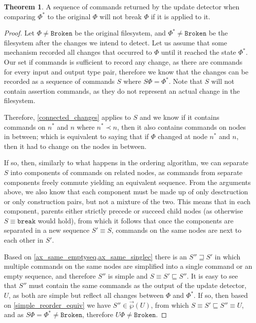 \documentclass[12pt]{article}
\newcommand{\fsbroken}{\mathtt{Broken}} %
\newcommand{\FS}{\Phi} %
\newcommand{\nn}{n^*} %
\newcommand{\cbrk}{\mathtt{break}} %
\newcommand{\descendant}{\prec}
\newcommand{\eqext}{\sqsubseteq} %
\newcommand{\eqnrw}{\sqsupseteq} %
\newcommand{\orderset}[1]{\vec{\wp}({#1})}
\theoremstyle{definition}
\newtheorem{myth}{Theorem}
\begin{document}
\begin{myth}\label{update_works}
A sequence of commands returned by the update detector
when comparing $\FS^*$ to the original $\FS$
will not break $\FS$ if it is applied to it.
\end{myth}
\begin{proof}
Let $\FS\neq\fsbroken$ be the original filesystem, and $\FS^*\neq\fsbroken$
be the filesystem after the changes we intend to detect.
Let us assume that some mechanism recorded all changes that occurred
to $\FS$ until it reached the state $\FS^*$.
Our set if commands is sufficient to record any change, as
there are commands for every input and output type pair, therefore
we know that the changes can be recorded as a sequence of commands $S$
where $S\FS=\FS^*$.
Note that $S$ will not contain assertion commands, as they do not
represent an actual change in the filesystem.

Therefore, \cref{connected_changes} applies to $S$ and we know
if it contains commands on $\nn$ and $n$ where $\nn\descendant n$,
then it also contains commands on nodes in between;
which is equivalent to saying that if $\FS$ changed
at node $\nn$ and $n$, then it had to change on the nodes in between.

If so, then, similarly to what happens in the ordering algorithm,
we can separate $S$ into components of commands on related nodes,
as commands from separate components freely commute yielding an equivalent sequence.
From the arguments above, we also know that each component
must be made up of only desctruction or only construction pairs,
but not a mixture of the two.
This means that in each component, parents either strictly precede or succeed child nodes
(as otherwise $S\equiv\cbrk$ would hold),
from which it follows that once the components are separated
in a new sequence $S'\equiv S$,
commands on the same nodes are next to each other in $S'$.

Based on \cref{ax_same_emptyseq,ax_same_singlec} there is
an $S''\eqnrw S'$ in which multiple commands on the same nodes
are simplified into a single command or an empty sequence,
and therefore $S''$ is simple and $S\equiv S'\eqext S''$.
It is easy to see that $S''$ must contain the same commands
as the output of the update detector, $U$, as both are simple
but reflect all changes between $\FS$ and $\FS^*$.
If so, then based on \cref{simple_reorder_equiv}
we have $S''\in\orderset{U}$, from which
$S\equiv S'\eqext S''\equiv U$, and as $S\FS = \FS^* \neq \fsbroken$,
therefore $U\FS\neq\fsbroken$.
\end{proof}
\end{document}

